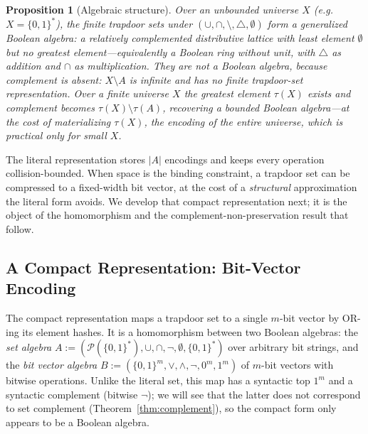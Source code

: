 \documentclass[10pt,conference]{IEEEtran}
\newtheorem{proposition}[theorem]{Proposition}
\begin{document}
\begin{proposition}[Algebraic structure]
\label{prop:gen-boolean}
Over an unbounded universe $X$ (e.g.\ $X = \{0,1\}^*$), the finite trapdoor sets under $(\cup, \cap, \setminus, \triangle, \emptyset)$ form a \emph{generalized} Boolean algebra: a relatively complemented distributive lattice with least element $\emptyset$ but no greatest element---equivalently a Boolean ring without unit, with $\triangle$ as addition and $\cap$ as multiplication. They are \emph{not} a Boolean algebra, because complement is absent: $X \setminus A$ is infinite and has no finite trapdoor-set representation. Over a finite universe $X$ the greatest element $\tau(X)$ exists and complement becomes $\tau(X) \setminus \tau(A)$, recovering a bounded Boolean algebra---at the cost of materializing $\tau(X)$, the encoding of the entire universe, which is practical only for small $X$.
\end{proposition}

The literal representation stores $|A|$ encodings and keeps every operation collision-bounded. When space is the binding constraint, a trapdoor set can be compressed to a fixed-width bit vector, at the cost of a \emph{structural} approximation the literal form avoids. We develop that compact representation next; it is the object of the homomorphism and the complement-non-preservation result that follow.

\subsection{A Compact Representation: Bit-Vector Encoding}
\label{sec:boolean-algebra}

The compact representation maps a trapdoor set to a single $m$-bit vector by OR-ing its element hashes. It is a homomorphism between two Boolean algebras: the \emph{set algebra} $A := (\mathcal{P}(\{0,1\}^*), \cup, \cap, \neg, \emptyset, \{0,1\}^*)$ over arbitrary bit strings, and the \emph{bit vector algebra} $B := (\{0,1\}^m, \lor, \land, \neg, 0^m, 1^m)$ of $m$-bit vectors with bitwise operations. Unlike the literal set, this map has a syntactic top $1^m$ and a syntactic complement (bitwise $\neg$); we will see that the latter does not correspond to set complement (Theorem~\ref{thm:complement}), so the compact form only appears to be a Boolean algebra.
\end{document}
